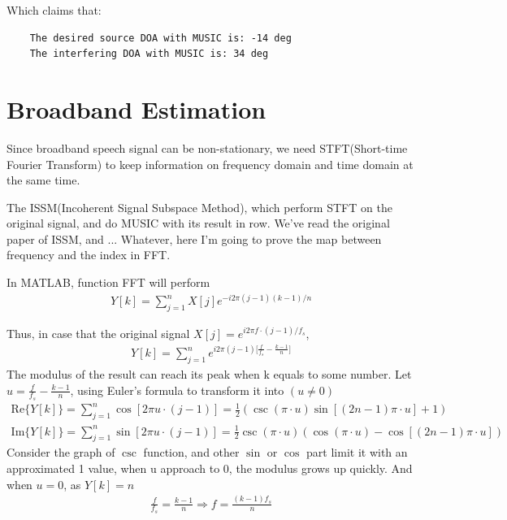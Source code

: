 \documentclass[UTF8]{article}
\begin{document}
Which claims that:
\begin{lstlisting}
    The desired source DOA with MUSIC is: -14 deg
    The interfering DOA with MUSIC is: 34 deg
\end{lstlisting}

\section{Broadband Estimation}
\hspace{0.5em} Since broadband speech signal can be non-stationary, we need STFT(Short-time Fourier Transform) to keep information on frequency domain and time domain at the same time.

The ISSM(Incoherent Signal Subspace Method), which perform STFT on the original signal, and do MUSIC with its result in row. We've read the original paper of ISSM, and ... Whatever, here I'm going to prove the map between frequency and the index in FFT.

In MATLAB, function FFT will perform
\begin{gather}
    Y[k] = \sum_{j = 1}^{n}{X[j]}e^{-i 2\pi(j - 1)(k - 1)/n}
\end{gather}

Thus, in case that the original signal $X[j] = e^{i 2 \pi f \cdot (j - 1) / f_s}$, 
\begin{gather*}
    Y[k] = \sum_{j = 1}^{n}{e^{i 2 \pi (j - 1)\big[\frac{f}{f_s} - \frac{k - 1}{n}\big]}}
\end{gather*}
The modulus of the result can reach its peak when k equals to some number. Let $u = \frac{f}{f_s} - \frac{k - 1}{n}$, using Euler's formula to transform it into $(u \neq 0)$
\begin{gather*}
    \mathrm{Re}\{ Y[k] \} = \sum_{j = 1}^n{\cos[ 2 \pi u \cdot (j - 1)]} = \frac{1}{2}(\csc(\pi \cdot u) \sin[(2n - 1)\pi \cdot u] + 1) \\
\mathrm{Im}\{ Y[k] \} = \sum_{j = 1}^n{\sin[ 2 \pi u \cdot (j - 1)]} = \frac{1}{2}\csc(\pi \cdot u)(\cos(\pi \cdot u) - \cos[(2n - 1)\pi \cdot u])
\end{gather*}
Consider the graph of $\csc$ function, and other $\sin$ or $\cos$ part limit it with an approximated 1 value, when u approach to 0, the modulus grows up quickly. And when $u = 0$, as $Y[k] = n$
\begin{gather}
    \frac{f}{f_s} = \frac{k - 1}{n} \Rightarrow f = \frac{(k - 1)f_s}{n}
\end{gather}
\end{document}
